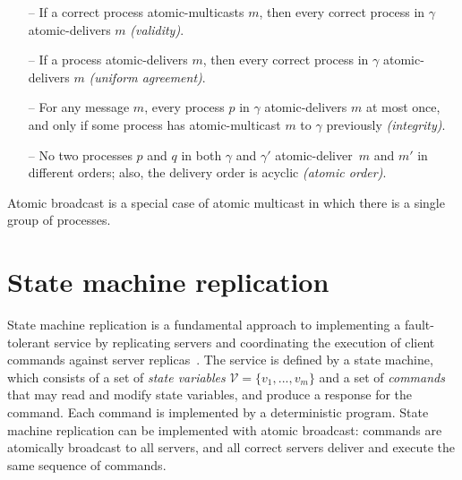 \documentclass[11pt]{article}
\newcommand{\vvm}{\mathcal{V}}
\newcommand{\amcast}{atomic-multicast}
\newcommand{\amdel}{atomic-deliver}
\begin{document}
\begin{itemize}

    \item[--] If a correct process \amcast{}s $m$, then every correct process in $\gamma$ \amdel{}s $m$ \emph{(validity)}.

    \item[--] If a process \amdel{}s $m$, then every correct process in $\gamma$ \amdel{}s $m$ \emph{(uniform agreement)}.

    \item[--] For any message $m$, every process $p$ in $\gamma$ \amdel{}s $m$ at most once, and only if some process has \amcast{} $m$ to $\gamma$ previously \emph{(integrity)}.

    \item[--] No two processes $p$ and $q$ in both $\gamma$ and $\gamma'$ \amdel\ $m$ and $m'$ in different orders; also, the delivery order is acyclic \emph{(atomic order)}.

\end{itemize}

Atomic broadcast is a special case of atomic multicast in which there is a single group of processes.


%



\section{State machine replication}
\label{sec:smr}

State machine replication is a fundamental approach to implementing a fault-tolerant service by replicating servers and coordinating the execution of client commands against server replicas~\cite{Lam78, Sch90}.
The service is defined by a state machine, which consists of a set of \emph{state variables} $\vvm = \{v_1, ..., v_m\}$
and a set of \emph{commands} that may read and modify state variables, and produce a response for the command.
Each command is implemented by a deterministic program.
State machine replication can be implemented with atomic broadcast: commands are atomically broadcast to all servers, and all correct servers deliver and execute the same sequence of commands.
\end{document}
